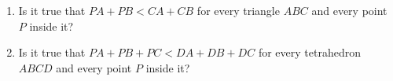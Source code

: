 \begin{enumerate}
\item[(a)] Is it true that $PA+PB<CA+CB$ for every triangle $ABC$ and every point $P$ inside it?
\item[(b)] Is it true that $PA+PB+PC<DA+DB+DC$ for every tetrahedron $ABCD$ and every point $P$ inside it?
\end{enumerate}
